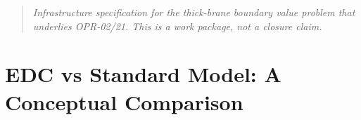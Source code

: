 \documentclass[11pt,a4paper]{book}
\theoremstyle{definition}
\theoremstyle{remark}
\begin{document}
\begin{quote}
\textit{Infrastructure specification for the thick-brane boundary value problem
that underlies OPR-02/21. This is a work package, not a closure claim.}
\end{quote}















\chapter*{EDC vs Standard Model: A Conceptual Comparison}
\end{document}
